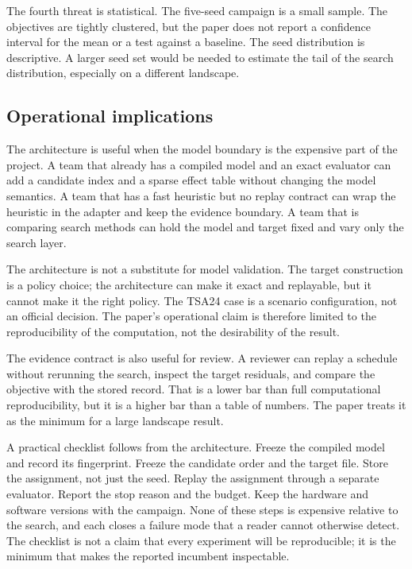 \documentclass[11pt]{article}
\begin{document}
The fourth threat is statistical. The five-seed campaign is a small sample. The objectives are tightly
clustered, but the paper does not report a confidence interval for the mean or a test against a
baseline. The seed distribution is descriptive. A larger seed set would be needed to estimate the
tail of the search distribution, especially on a different landscape.

\subsection{Operational implications}

The architecture is useful when the model boundary is the expensive part of the project. A team that
already has a compiled model and an exact evaluator can add a candidate index and a sparse effect
table without changing the model semantics. A team that has a fast heuristic but no replay contract
can wrap the heuristic in the adapter and keep the evidence boundary. A team that is comparing search
methods can hold the model and target fixed and vary only the search layer.

The architecture is not a substitute for model validation. The target construction is a policy choice;
the architecture can make it exact and replayable, but it cannot make it the right policy. The TSA24
case is a scenario configuration, not an official decision. The paper's operational claim is therefore
limited to the reproducibility of the computation, not the desirability of the result.

The evidence contract is also useful for review. A reviewer can replay a schedule without rerunning
the search, inspect the target residuals, and compare the objective with the stored record. That is a
lower bar than full computational reproducibility, but it is a higher bar than a table of numbers. The
paper treats it as the minimum for a large landscape result.

A practical checklist follows from the architecture. Freeze the compiled model and record its
fingerprint. Freeze the candidate order and the target file. Store the assignment, not just the seed.
Replay the assignment through a separate evaluator. Report the stop reason and the budget. Keep the
hardware and software versions with the campaign. None of these steps is expensive relative to the
search, and each closes a failure mode that a reader cannot otherwise detect. The checklist is not a
claim that every experiment will be reproducible; it is the minimum that makes the reported incumbent
inspectable.
\end{document}
